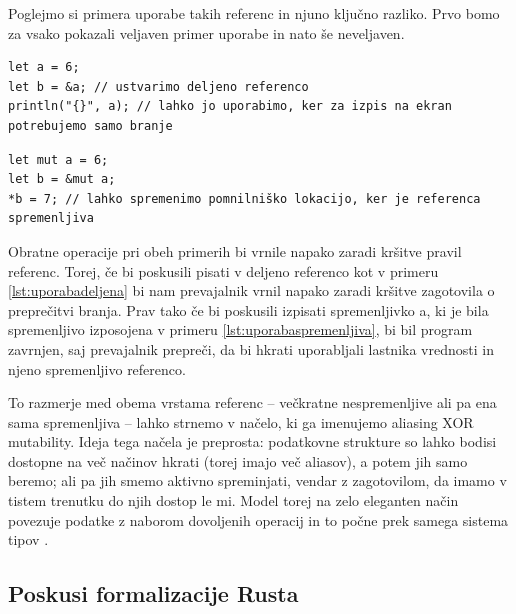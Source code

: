 \documentclass{article}
\begin{document}
Poglejmo si primera uporabe takih referenc in njuno ključno razliko. Prvo bomo za vsako pokazali veljaven primer uporabe
in nato še neveljaven.

\begin{lstlisting}[caption=Uporaba deljene reference, label={lst:uporabadeljena}]
let a = 6;
let b = &a; // ustvarimo deljeno referenco
println("{}", a); // lahko jo uporabimo, ker za izpis na ekran potrebujemo samo branje
\end{lstlisting}

\begin{lstlisting}[caption=Uporaba spremenljive reference, label=lst:uporabaspremenljiva]
let mut a = 6;
let b = &mut a;
*b = 7; // lahko spremenimo pomnilniško lokacijo, ker je referenca spremenljiva
\end{lstlisting}

Obratne operacije pri obeh primerih bi vrnile napako zaradi kršitve pravil referenc. Torej, če bi poskusili pisati
v deljeno referenco kot v primeru \ref{lst:uporabadeljena} bi nam prevajalnik vrnil napako zaradi kršitve zagotovila o preprečitvi
branja. Prav tako če bi poskusili izpisati spremenljivko a, ki je bila spremenljivo izposojena v primeru \ref{lst:uporabaspremenljiva},
bi bil program zavrnjen, saj prevajalnik prepreči, da bi hkrati uporabljali lastnika vrednosti in njeno spremenljivo referenco.

To razmerje med obema vrstama referenc – večkratne nespremenljive ali pa ena sama spremenljiva – lahko strnemo v načelo, ki ga imenujemo aliasing XOR mutability. Ideja tega načela je preprosta: podatkovne strukture so lahko bodisi dostopne na več načinov hkrati (torej imajo več aliasov), a potem jih samo beremo; ali pa jih smemo aktivno spreminjati, vendar z zagotovilom, da imamo v tistem trenutku do njih dostop le mi. Model torej na zelo eleganten način povezuje podatke z naborom dovoljenih operacij in to počne prek samega sistema tipov \cite{yanovskiGhostCellSeparatingPermissions2021}.



\subsection{Poskusi formalizacije Rusta}
\end{document}
